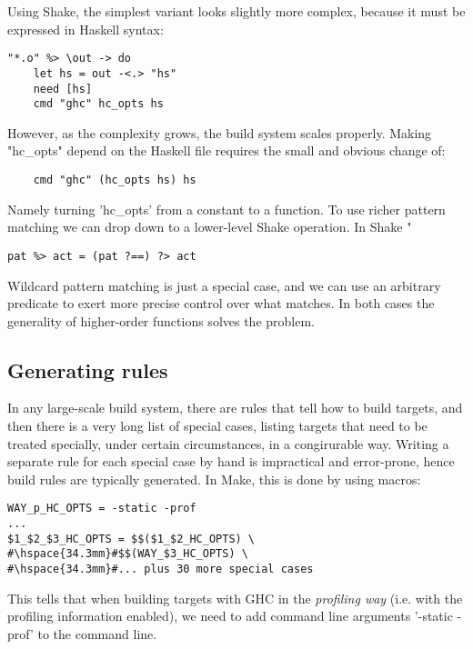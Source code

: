 \noindent Using Shake, the simplest variant looks slightly more complex, because
it must be expressed in Haskell syntax:

\begin{lstlisting}
"*.o" %> \out -> do
    let hs = out -<.> "hs"
    need [hs]
    cmd "ghc" hc_opts hs
\end{lstlisting}
\noindent
However, as the complexity grows, the build system scales properly. Making
\lst"hc_opts" depend on the Haskell file requires the small and obvious change of:

\begin{lstlisting}
    cmd "ghc" (hc_opts hs) hs
\end{lstlisting}

\noindent Namely turning \lst'hc_opts' from a constant to a function. To use richer pattern matching we can drop down to a lower-level Shake operation. In Shake \lst"%

\begin{lstlisting}
pat %> act = (pat ?==) ?> act
\end{lstlisting}
\noindent
Wildcard pattern matching is just a special case, and we can use an
arbitrary predicate to exert more precise control over what matches.
In both cases the generality of higher-order functions solves the problem.

\subsection{Generating rules}

In any large-scale build system, there are rules that tell how to build targets,
and then there is a very long list of special cases, listing targets that need
to be treated specially, under certain circumstances, in a congirurable way.
Writing a separate rule for each special case by hand is impractical and
error-prone, hence build rules are typically generated. In Make, this is done by
using macros:

\begin{lstlisting}
WAY_p_HC_OPTS = -static -prof
...
$1_$2_$3_HC_OPTS = $$($1_$2_HC_OPTS) \
#\hspace{34.3mm}#$$(WAY_$3_HC_OPTS) \
#\hspace{34.3mm}#... plus 30 more special cases
\end{lstlisting}

This tells that when building targets with GHC in the \emph{profiling way}
(i.e. with the profiling information enabled), we need to add command line
arguments \lst'-static -prof' to the command line.

